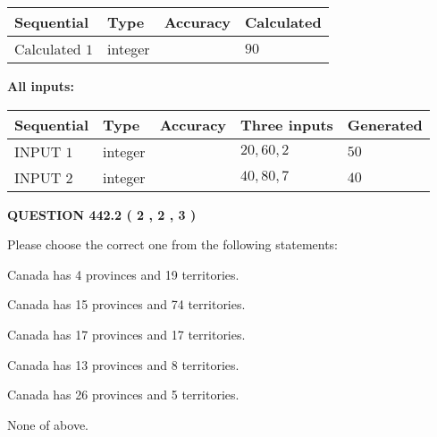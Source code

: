 \documentclass[12pt]{article}
\begin{document}
   
   
   
\noindent{}
   
   
  
  
\noindent\begin{tabular}{|l|l|l|l|}
\hline
 Sequential & Type & Accuracy & Calculated \\ 
\hline
 
 
  Calculated $  1 $ & integer &  & 
  $ 90 $ 
 \\  \hline  
 \end{tabular}
   
   
   
   
\noindent\vspace{0.1in}\hspace{-0.08in} {\textbf{\Large{All inputs: }}}
   
   
  
  
\noindent\begin{tabular}{|l|l|l|l|l|}
\hline
 Sequential & Type & Accuracy & Three inputs & Generated \\ 
\hline
 
 
  INPUT $  1 $ & integer &  & $
 20
 , 
 60
 , 
 2
 $ & $ 50 $ 
 \\  \hline  
 
 
  INPUT $  2 $ & integer &  & $
 40
 , 
 80
 , 
 7
 $ & $ 40 $ 
 \\  \hline  
 \end{tabular}
   
   
  
\vspace{0.2in}
  
{\textbf{\Large{QUESTION
442.2 
 ( 2 , 2 , 3 )
}}}
  
  
Please choose the correct one from the following statements:
 
 
Canada has   4 provinces and  19 territories.
 
 
Canada has  15 provinces and  74 territories.
 
 
Canada has  17 provinces and  17 territories.
 
 
Canada has  13 provinces and  8 territories.
 
 
Canada has  26 provinces and  5 territories.
 
 
 None of above.
 
\end{document}
